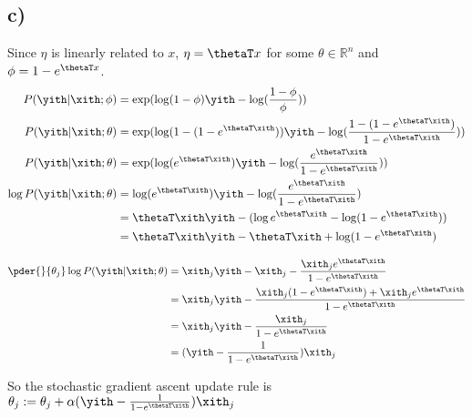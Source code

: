\documentclass[11pt]{article}
\begin{document}
\subsection*{c)}

Since $\eta$ is linearly related to $x$, $\eta = \thetaT x$ for some $\theta \in \mathbb{R}^n$ and $\phi = 1 - e^{\thetaT x}$.
\begin{align*}
    P(\yith|\xith;\phi)        &= \exp(\log(1-\phi)\yith - \log(\frac{1-\phi}{\phi})) \\
    P(\yith|\xith;\theta)      &= \exp(\log(1 - (1-e^{\thetaT \xith}))\yith - \log(\frac{1-(1-e^{\thetaT \xith})}{1 - e^{\thetaT \xith}})) \\
    P(\yith|\xith;\theta)      &= \exp(\log(e^{\thetaT \xith})\yith - \log(\frac{e^{\thetaT \xith}}{1 - e^{\thetaT \xith}})) \\
    \log P(\yith|\xith;\theta) &= \log(e^{\thetaT \xith})\yith - \log(\frac{e^{\thetaT \xith}}{1 - e^{\thetaT \xith}}) \\
                               &= \thetaT \xith \yith - ( \log e^{\thetaT \xith} - \log (1 - e^{\thetaT \xith})) \\
                               &= \thetaT \xith \yith - \thetaT \xith + \log (1 - e^{\thetaT \xith}) \\
\end{align*}

\begin{align*}
    \pder{}{\theta_j} \log P(\yith|\xith;\theta) &= \xith_j \yith - \xith_j - \frac{\xith_j e^{\thetaT \xith}}{1 - e^{\thetaT \xith}} \\
        &= \xith_j \yith - \frac{\xith_j(1-e^{\thetaT \xith}) + \xith_j e^{\thetaT \xith}}{1 - e^{\thetaT \xith}} \\
        &= \xith_j \yith - \frac{\xith_j}{1 - e^{\thetaT \xith}} \\
        &= (\yith - \frac{1}{1-e^{\thetaT \xith}}) \xith_j \\
\end{align*}

So the stochastic gradient ascent update rule is $\theta_j := \theta_j + \alpha (\yith - \frac{1}{1 - e^{\thetaT \xith}}) \xith_j$ \\
\end{document}
